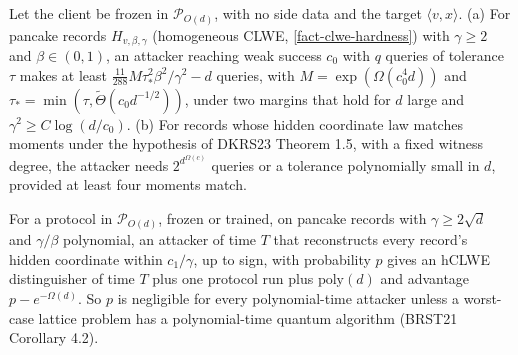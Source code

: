 \begin{proposition}
Let the client be frozen in $\mathcal P_{O(d)}$, with no side data and the target
$\langle v,x\rangle$. (a) For pancake records $H_{v,\beta,\gamma}$ (homogeneous CLWE,
\cref{fact-clwe-hardness}) with $\gamma\ge2$ and $\beta\in(0,1)$, an attacker reaching
weak success $c_0$ with $q$ queries of tolerance $\tau$ makes at least
$\frac{11}{288}M\tau_*^2\beta^2/\gamma^2-d$ queries, with $M=\exp(\Omega(c_0^4d))$ and
$\tau_*=\min(\tau,\tilde\Theta(c_0d^{-1/2}))$, under two margins that hold for $d$ large
and $\gamma^2\ge C\log(d/c_0)$. (b) For records whose hidden coordinate law matches
moments under the hypothesis of DKRS23 Theorem 1.5, with a fixed witness degree,
the attacker needs $2^{d^{\Omega(c)}}$ queries or a tolerance polynomially small in
$d$, provided at least four moments match.
\end{proposition}

\begin{proposition}
For a protocol in $\mathcal P_{O(d)}$, frozen or trained, on pancake records with
$\gamma\ge2\sqrt d$ and $\gamma/\beta$ polynomial, an attacker of time $T$ that
reconstructs every record's hidden coordinate within $c_1/\gamma$, up to sign, with
probability $p$ gives an hCLWE distinguisher of time $T$ plus one protocol run plus
$\mathrm{poly}(d)$ and advantage $p-e^{-\Omega(d)}$. So $p$ is negligible for every
polynomial-time attacker unless a worst-case lattice problem has a polynomial-time
quantum algorithm (BRST21 Corollary 4.2).
\end{proposition}

